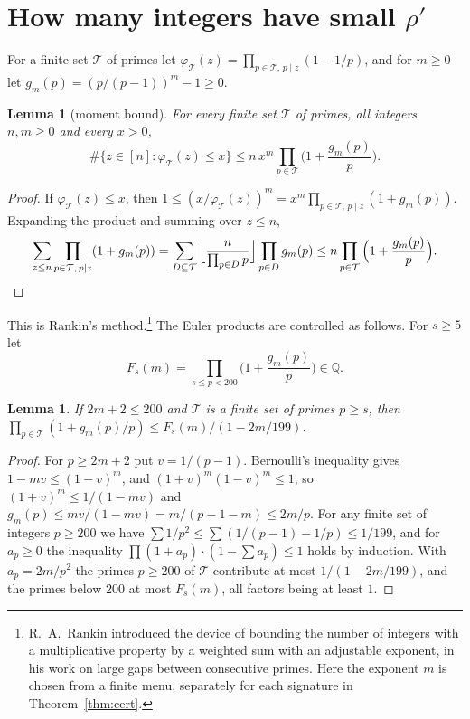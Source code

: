 \documentclass[11pt,a4paper]{article}
\newtheorem{lemma}[theorem]{Lemma}
\theoremstyle{definition}
\theoremstyle{remark}
\begin{document}
\section{\texorpdfstring{How many integers have small $\rho'$}{How many integers have small rho'}}\label{sec:density}

For a finite set $\mathcal{T}$ of primes let $\varphi_\mathcal{T}(z)=\prod_{p\in\mathcal{T},\,p\mid
z}(1-1/p)$, and for $m\ge0$ let $g_m(p)=(p/(p-1))^m-1\ge0$.

\begin{lemma}[moment bound]\label{lem:moment}
For every finite set $\mathcal{T}$ of primes, all integers $n,m\ge0$ and every $x>0$,
\[
  \#\{z\in[n]:\varphi_\mathcal{T}(z)\le x\}\le n\,x^m\prod_{p\in\mathcal{T}}\Big(1+\frac{g_m(p)}p\Big).
\]
\end{lemma}

\begin{proof}
If $\varphi_\mathcal{T}(z)\le x$, then $1\le(x/\varphi_\mathcal{T}(z))^m=x^m\prod_{p\in\mathcal{T},\,
p\mid z}(1+g_m(p))$. Expanding the product and summing over $z\le n$,
\[
  \sum_{z\le n}\prod_{p\in\mathcal{T},\,p\mid z}(1+g_m(p))=\sum_{D\subseteq\mathcal{T}}
  \Big\lfloor\frac n{\prod_{p\in D}p}\Big\rfloor\prod_{p\in D}g_m(p)\le
  n\prod_{p\in\mathcal{T}}\Big(1+\frac{g_m(p)}p\Big). \qedhere
\]
\end{proof}

This is Rankin's method.\footnote{R.~A.~Rankin \cite{Rankin38} introduced the device of bounding the
number of integers with a multiplicative property by a weighted sum with an adjustable exponent, in
his work on large gaps between consecutive primes. Here the exponent $m$ is chosen from a finite
menu, separately for each signature in Theorem~\ref{thm:cert}.} The Euler products are controlled as
follows. For $s\ge5$ let
\[
  F_s(m)=\prod_{s\le p<200}\Big(1+\frac{g_m(p)}p\Big)\in\mathbb{Q}.
\]

\begin{lemma}\label{lem:tail}
If $2m+2\le200$ and $\mathcal{T}$ is a finite set of primes $p\ge s$, then
$\prod_{p\in\mathcal{T}}(1+g_m(p)/p)\le F_s(m)/(1-2m/199)$.
\end{lemma}

\begin{proof}
For $p\ge2m+2$ put $v=1/(p-1)$. Bernoulli's inequality gives $1-mv\le(1-v)^m$, and
$(1+v)^m(1-v)^m\le1$, so $(1+v)^m\le1/(1-mv)$ and $g_m(p)\le mv/(1-mv)=m/(p-1-m)\le2m/p$. For any
finite set of integers $p\ge200$ we have $\sum1/p^2\le\sum(1/(p-1)-1/p)\le1/199$, and for $a_p\ge0$
the inequality $\prod(1+a_p)\cdot(1-\sum a_p)\le1$ holds by induction. With $a_p=2m/p^2$ the primes
$p\ge200$ of $\mathcal{T}$ contribute at most $1/(1-2m/199)$, and the primes below $200$ at most
$F_s(m)$, all factors being at least $1$.
\end{proof}
\end{document}
